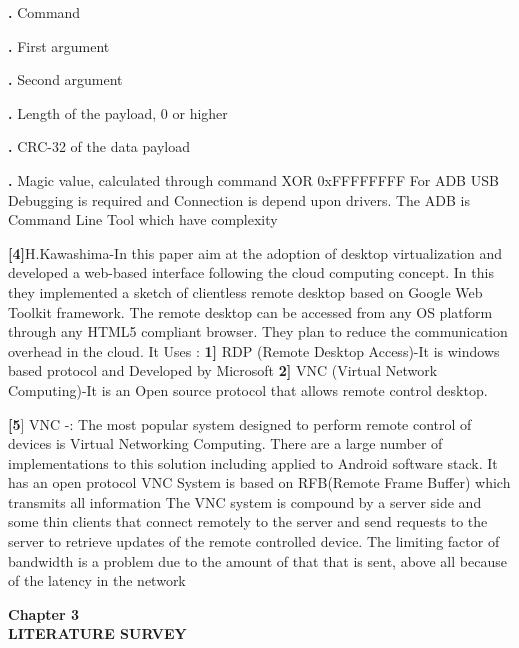 \documentclass[12pt]{article}
\begin{document}
\par\textbf{.} Command
\par\textbf{.} First argument
\par\textbf{.} Second argument
\par\textbf{.} Length of the payload, 0 or higher
\par\textbf{.} CRC-32 of the data payload
\par\textbf{.} Magic value, calculated through command XOR 0xFFFFFFFF
For ADB USB Debugging is required and Connection is depend upon drivers. The ADB is
Command Line Tool which have complexity
\par\textbf{[4]}H.Kawashima-In this paper aim at the adoption of desktop virtualization and
developed a web-based interface following the cloud computing concept. In this they
implemented a sketch of clientless remote desktop based on Google Web Toolkit
framework. The remote desktop can be accessed from any OS platform through any
HTML5 compliant browser. They plan to reduce the communication overhead in the
cloud.
It Uses :
\textbf{1]} RDP (Remote Desktop Access)-It is windows based protocol and Developed by
Microsoft
\textbf{2]} VNC (Virtual Network Computing)-It is an Open source protocol that allows remote
control desktop.\par
\textbf{[5}] VNC -: The most popular system designed to perform remote control of devices is
Virtual Networking Computing. There are a large number of
implementations to this solution including applied to Android software
stack. It has an open protocol
VNC System is based on RFB(Remote Frame Buffer) which transmits all information The
VNC system is compound by a server side and some thin clients that connect remotely to
the server and send requests to the server to retrieve updates of the remote controlled
device.
The limiting factor of bandwidth is a problem due to the amount of that that is sent,
above all because of the latency in the network

\clearpage


\begin{center}
 \LARGE \textbf {Chapter 3 }\\[10mm]
 \Large \textbf{LITERATURE SURVEY}\\[10mm]
 \end{center}
\end{document}
